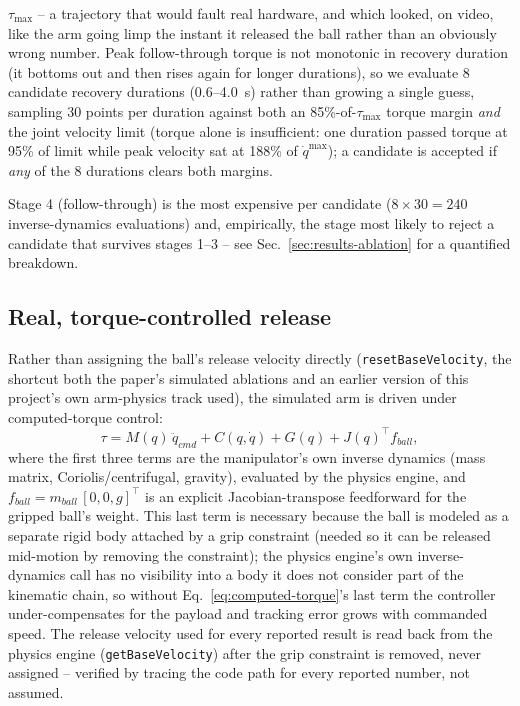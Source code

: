 \documentclass[conference]{IEEEtran}
\begin{document}
\begin{enumerate}
$\tau_{\max}$ -- a trajectory that would fault real hardware, and which
looked, on video, like the arm going limp the instant it released the
ball rather than an obviously wrong number. Peak follow-through torque is
not monotonic in recovery duration (it bottoms out and then rises again for
longer durations), so we evaluate 8 candidate recovery durations
(0.6--4.0~s) rather than growing a single guess, sampling 30 points per
duration against both an 85\%-of-$\tau_{\max}$ torque margin \emph{and} the
joint velocity limit (torque alone is insufficient: one duration passed
torque at 95\% of limit while peak velocity sat at 188\% of $\dot
q^{\max}$); a candidate is accepted if \emph{any} of the 8 durations clears
both margins.
\end{enumerate}

Stage 4 (follow-through) is the most expensive per candidate ($8\times30 =
240$ inverse-dynamics evaluations) and, empirically, the stage most likely
to reject a candidate that survives stages 1--3 -- see
Sec.~\ref{sec:results-ablation} for a quantified breakdown.

\subsection{Real, torque-controlled release}
\label{sec:method-torque}
Rather than assigning the ball's release velocity directly
(\texttt{resetBaseVelocity}, the shortcut both the paper's simulated
ablations and an earlier version of this project's own arm-physics track
used), the simulated arm is driven under computed-torque control:
\begin{equation}
\tau = M(q)\,\ddot q_{cmd} + C(q,\dot q) + G(q) + J(q)^\top f_{ball},
\label{eq:computed-torque}
\end{equation}
where the first three terms are the manipulator's own inverse dynamics
(mass matrix, Coriolis/centrifugal, gravity), evaluated by the physics
engine, and $f_{ball} = m_{ball}\,[0,0,g]^\top$ is an explicit
Jacobian-transpose feedforward for the gripped ball's weight. This last
term is necessary because the ball is modeled as a separate rigid body
attached by a grip constraint (needed so it can be released mid-motion by
removing the constraint); the physics engine's own inverse-dynamics call
has no visibility into a body it does not consider part of the kinematic
chain, so without Eq.~\eqref{eq:computed-torque}'s last term the controller
under-compensates for the payload and tracking error grows with commanded
speed. The release velocity used for every reported result is read back
from the physics engine (\texttt{getBaseVelocity}) after the grip
constraint is removed, never assigned -- verified by tracing the code path
for every reported number, not assumed.
\end{document}
